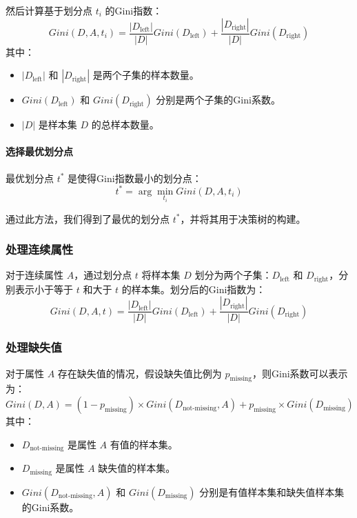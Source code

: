 然后计算基于划分点 \(t_i\) 的Gini指数：
\begin{equation}
Gini(D, A, t_i) = \frac{|D_{\text{left}}|}{|D|} Gini(D_{\text{left}}) + \frac{|D_{\text{right}}|}{|D|} Gini(D_{\text{right}})
\end{equation}
其中：
\begin{itemize}
  \item \(|D_{\text{left}}|\) 和 \(|D_{\text{right}}|\) 是两个子集的样本数量。
  \item \(Gini(D_{\text{left}})\) 和 \(Gini(D_{\text{right}})\) 分别是两个子集的Gini系数。
  \item \(|D|\) 是样本集 \(D\) 的总样本数量。
\end{itemize}
\paragraph{选择最优划分点}
最优划分点 \(t^*\) 是使得Gini指数最小的划分点：
\begin{equation}
t^* = \arg\min_{t_i} Gini(D, A, t_i)
\end{equation}

通过此方法，我们得到了最优的划分点 \(t^*\)，并将其用于决策树的构建。






\subsubsection{处理连续属性}
对于连续属性 \(A\)，通过划分点 \(t\) 将样本集 \(D\) 划分为两个子集：\(D_{\text{left}}\) 和 \(D_{\text{right}}\)，分别表示小于等于 \(t\) 和大于 \(t\) 的样本集。划分后的Gini指数为：
\begin{equation}
Gini(D, A, t) = \frac{|D_{\text{left}}|}{|D|} Gini(D_{\text{left}}) + \frac{|D_{\text{right}}|}{|D|} Gini(D_{\text{right}})
\end{equation}


\subsubsection{处理缺失值}
对于属性 \(A\) 存在缺失值的情况，假设缺失值比例为 \(p_{\text{missing}}\)，则Gini系数可以表示为：
\begin{equation}
Gini(D, A) = (1 - p_{\text{missing}}) \times Gini(D_{\text{not-missing}}, A) + p_{\text{missing}} \times Gini(D_{\text{missing}})
\end{equation}
其中：
\begin{itemize}
  \item \(D_{\text{not-missing}}\) 是属性 \(A\) 有值的样本集。
  \item \(D_{\text{missing}}\) 是属性 \(A\) 缺失值的样本集。
  \item \(Gini(D_{\text{not-missing}}, A)\) 和 \(Gini(D_{\text{missing}})\) 分别是有值样本集和缺失值样本集的Gini系数。
\end{itemize}

